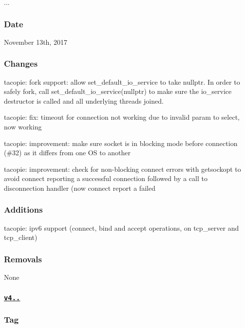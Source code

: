 {..}. \subsubsection*{Date}

November 13th, 2017 \subsubsection*{Changes}


\begin{DoxyItemize}
\item tacopie\+: fork support\+: allow set\+\_\+default\+\_\+io\+\_\+service to take nullptr. In order to safely fork, call set\+\_\+default\+\_\+io\+\_\+service(nullptr) to make sure the io\+\_\+service destructor is called and all underlying threads joined.
\item tacopie\+: fix\+: timeout for connection not working due to invalid param to select, now working
\item tacopie\+: improvement\+: make sure socket is in blocking mode before connection (\#32) as it differs from one OS to another
\item tacopie\+: improvement\+: check for non-\/blocking connect errors with getsockopt to avoid connect reporting a successful connection followed by a call to disconnection handler (now connect report a failed \subsubsection*{Additions}
\end{DoxyItemize}


\begin{DoxyItemize}
\item tacopie\+: ipv6 support (connect, bind and accept operations, on tcp\+\_\+server and tcp\+\_\+client) \subsubsection*{Removals}
\end{DoxyItemize}

None

\subsubsection*{\href{https://github.com/Cylix/cpp_redis/releases/tag/4.2.0}{\tt v4..}}

\subsubsection*{Tag}


